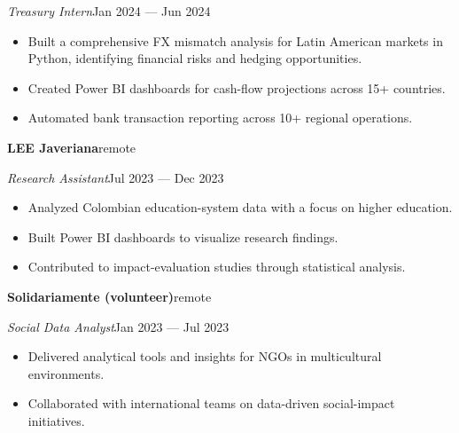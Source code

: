 \documentclass[a4paper,10pt]{article}
\newcommand{\headline}[2]{\needspace{3\baselineskip}\textbf{\color{ink}#1}\hfill{\small #2}\par}
\newcommand{\subline}[2]{\textit{#1}\hfill{\small #2}\par}
\begin{document}
\subline{Treasury Intern}{Jan 2024 --- Jun 2024}
\begin{itemize}[leftmargin=1.1em, itemsep=0pt, topsep=1pt, parsep=0pt]
  \item Built a comprehensive FX mismatch analysis for Latin American markets in Python, identifying financial risks and hedging opportunities.
  \item Created Power BI dashboards for cash-flow projections across 15+ countries.
  \item Automated bank transaction reporting across 10+ regional operations.
\end{itemize}
\vspace{4pt}
\headline{LEE Javeriana}{remote}
\vspace{1pt}
\subline{Research Assistant}{Jul 2023 --- Dec 2023}
\begin{itemize}[leftmargin=1.1em, itemsep=0pt, topsep=1pt, parsep=0pt]
  \item Analyzed Colombian education-system data with a focus on higher education.
  \item Built Power BI dashboards to visualize research findings.
  \item Contributed to impact-evaluation studies through statistical analysis.
\end{itemize}
\vspace{4pt}
\headline{Solidariamente (volunteer)}{remote}
\vspace{1pt}
\subline{Social Data Analyst}{Jan 2023 --- Jul 2023}
\begin{itemize}[leftmargin=1.1em, itemsep=0pt, topsep=1pt, parsep=0pt]
  \item Delivered analytical tools and insights for NGOs in multicultural environments.
  \item Collaborated with international teams on data-driven social-impact initiatives.
\end{itemize}
\vspace{4pt}
\end{document}
